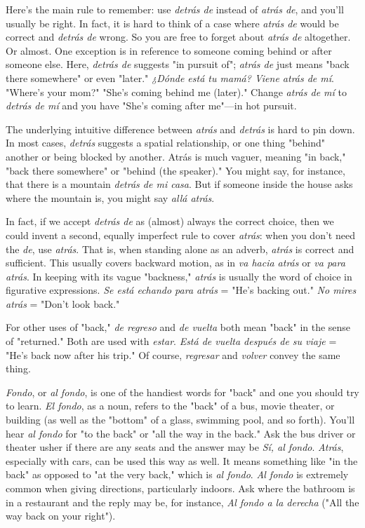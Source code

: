 Here's the main rule to remember: use \emph{detrás de} instead of
\emph{atrás de}, and you'll usually be right. In fact, it is hard to think of a case
where \emph{atrás de} would be correct and \emph{detrás de} wrong. So you are free
to forget about \emph{atrás de} altogether. Or almost. One exception is in reference to someone coming behind or after someone else. Here, \emph{detrás
de} suggests "in pursuit of"; \emph{atrás de} just means "back there somewhere" or even "later." \emph{¿Dónde está tu mamá? Viene atrás de mí}.
"Where's your mom?" "She's coming behind me (later)." Change \emph{atrás
de mí} to \emph{detrás de mí} and you have "She's coming after me"---in
hot pursuit.

The underlying intuitive difference between \emph{atrás} and \emph{detrás}
is hard to pin down. In most cases, \emph{detrás} suggests a spatial relationship, or one thing "behind" another or being blocked by another. Atrás
is much vaguer, meaning "in back," "back there somewhere" or "behind (the speaker)." You might say, for instance, that there is a mountain \emph{detrás de mi casa}. But if someone inside the house asks where the
mountain is, you might say \emph{allá atrás}.

In fact, if we accept \emph{detrás de} as (almost) always the correct
choice, then we could invent a second, equally imperfect rule to cover
\emph{atrás}: when you don't need the \emph{de}, use \emph{atrás}. That is, when standing
alone as an adverb, \emph{atrás} is correct and sufficient. This usually covers
backward motion, as in \emph{va hacia atrás} or \emph{va para atrás}. In keeping
with its vague "backness," \emph{atrás} is usually the word of choice in figurative expressions. \emph{Se está echando para atrás} = "He's backing out."
\emph{No mires atrás} = "Don't look back."

For other uses of "back," \emph{de regreso} and \emph{de vuelta} both mean
"back" in the sense of "returned." Both are used with \emph{estar}. \emph{Está de
vuelta después de su viaje} = "He's back now after his trip." Of course,
\emph{regresar} and \emph{volver} convey the same thing.

\emph{Fondo}, or \emph{al fondo}, is one of the handiest words for "back"
and one you should try to learn. \emph{El fondo}, as a noun, refers to the
"back" of a bus, movie theater, or building (as well as the "bottom"
of a glass, swimming pool, and so forth). You'll hear \emph{al fondo} for "to
the back" or "all the way in the back." Ask the bus driver or theater
usher if there are any seats and the answer may be \emph{Sí, al fondo}. \emph{Atrás},
especially with cars, can be used this way as well. It means something
like "in the back" as opposed to "at the very back," which is \emph{al fondo}.
\emph{Al fondo} is extremely common when giving directions, particularly
indoors. Ask where the bathroom is in a restaurant and the reply may
be, for instance, \emph{Al fondo a la derecha} ("All the way back on your
right").

